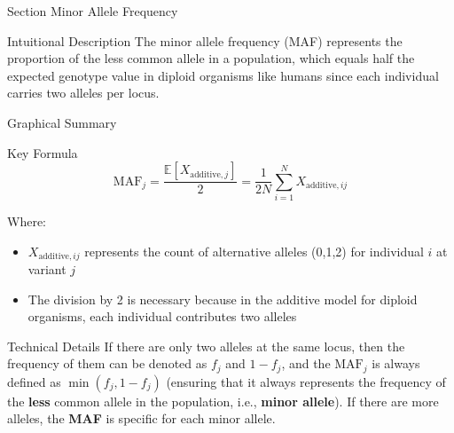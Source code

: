 
\begin{frame}{Section}
\centering
\Huge{Minor Allele Frequency}
\end{frame}


\begin{frame}{Intuitional Description}
The minor allele frequency (MAF) represents the proportion of the less common allele in a population, which equals half the expected genotype value in diploid organisms like humans since each individual carries two alleles per locus.
\end{frame}

\begin{frame}{Graphical Summary}

\end{frame}


\begin{frame}{Key Formula}
$$\text{MAF}_j = \frac{\mathbb{E}[X_{\text{additive},j}]}{2} = \frac{1}{2N}\sum_{i=1}^{N} X_{\text{additive},ij}$$

Where:
\begin{itemize}
\item $X_{\text{additive},ij}$ represents the count of alternative alleles (0,1,2) for individual $i$ at variant $j$
\item The division by 2 is necessary because in the additive model for diploid organisms, each individual contributes two alleles
\end{itemize}
\end{frame}


\begin{frame}{Technical Details}
If there are only two alleles at the same locus, then the frequency of them can be denoted as $f_j$ and $1-f_j$, and the $\text{MAF}_j$ is always defined as $\min(f_j, 1 - f_j)$ (ensuring that it always represents the frequency of the \textbf{less} common allele in the population, i.e., \textbf{minor allele}). If there are more alleles, the \textbf{MAF} is specific for each minor allele.

\end{frame}

